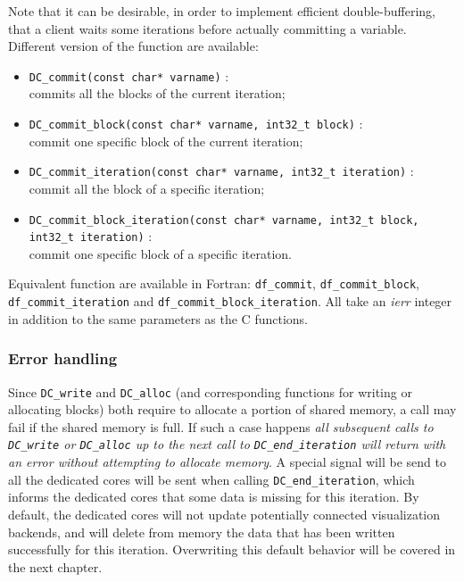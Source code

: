 \documentclass[11pt]{report}
\newcommand{\function}[1]{\texttt{#1}}
\begin{document}
Note that it can be desirable,
in order to implement efficient double-buffering, that a client waits some iterations before actually committing 
a variable. Different version of the function are available:
\begin{itemize}
\item \function{DC\_commit(const char* varname)} : \\ commits all the blocks of the current iteration;
\item \function{DC\_commit\_block(const char* varname, int32\_t block)} : \\ commit one specific block of the current iteration;
\item \function{DC\_commit\_iteration(const char* varname, int32\_t iteration)} : \\ commit all the block of a specific iteration;
\item \function{DC\_commit\_block\_iteration(const char* varname, int32\_t block, int32\_t iteration)} : \\ commit one specific block of a specific iteration.
\end{itemize}

Equivalent function are available in Fortran: \function{df\_commit},
\function{df\_commit\_block}, \function{df\_commit\_iteration} and \function{df\_commit\_block\_iteration}.
All take an \emph{ierr} integer in addition to the same parameters as the C functions.

\subsubsection{Error handling}\label{sec:error}

Since \function{DC\_write} and \function{DC\_alloc} (and corresponding functions for writing or
allocating blocks) both require to allocate a portion of shared memory, a call may fail if the shared memory
is full. If such a case happens \emph{all subsequent calls to \function{DC\_write} or \function{DC\_alloc}
up to the next call to \function{DC\_end\_iteration} will return with an error without attempting
to allocate memory}. A special signal will be send to all the dedicated cores will be sent when
calling \function{DC\_end\_iteration}, which informs the dedicated cores that some data is missing
for this iteration. By default, the dedicated cores will not update potentially connected visualization backends,
and will delete from memory the data that has been written successfully for this iteration.
Overwriting this default behavior will be covered in the next chapter.
\end{document}
